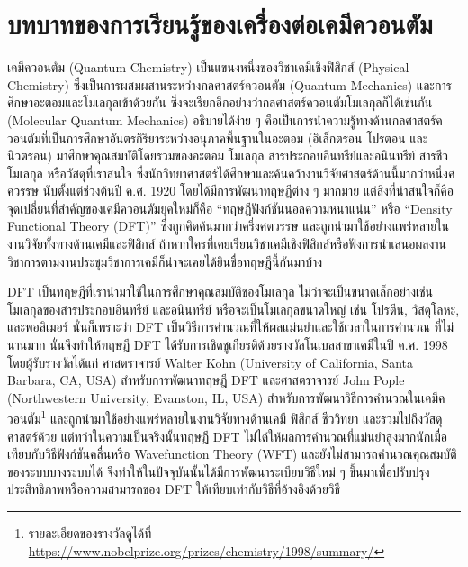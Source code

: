 \section{บทบาทของการเรียนรู้ของเครื่องต่อเคมีควอนตัม}
\label{sec:ml_in_qm}

เคมีควอนตัม (Quantum Chemistry) เป็นแขนงหนึ่งของวิชาเคมีเชิงฟิสิกส์ (Physical Chemistry) ซึ่งเป็นการผสมผสานระหว่างกลศาสตร์ควอนตัม 
(Quantum Mechanics) และการศึกษาอะตอมและโมเลกุลเข้าด้วยกัน ซึ่งจะเรียกอีกอย่างว่ากลศาสตร์ควอนตัมโมเลกุลก็ได้เช่นกัน (Molecular 
Quantum Mechanics) อธิบายได้ง่าย ๆ คือเป็นการนำความรู้ทางด้านกลศาสตร์ควอนตัมที่เป็นการศึกษาอันตรกิริยาระหว่างอนุภาคพื้นฐานในอะตอม 
(อิเล็กตรอน โปรตอน และนิวตรอน) มาศึกษาคุณสมบัติโดยรวมของอะตอม โมเลกุล สารประกอบอินทรีย์และอนินทรีย์ สารชีวโมเลกุล หรือวัสดุที่เราสนใจ 
ซึ่งนักวิทยาศาสตร์ได้ศึกษาและค้นคว้างานวิจัยศาสตร์ด้านนี้มากว่าหนึ่งศควรรษ นับตั้งแต่ช่วงต้นปี ค.ศ. 1920 โดยได้มีการพัฒนาทฤษฎีต่าง ๆ มากมาย 
แต่สิ่งที่น่าสนใจก็คือจุดเปลี่ยนที่สำคัญของเคมีควอนตัมยุคใหม่ก็คือ \enquote{ทฤษฎีฟังก์ชันนอลความหนาแน่น} หรือ \enquote{Density Functional 
Theory (DFT)}\autocite{kohn1996} ซึ่งถูกคิดค้นมากว่าครึ่งศตวรรษ และถูกนำมาใช้อย่างแพร่หลายในงานวิจัยทั้งทางด้านเคมีและฟิสิกส์ 
ถ้าหากใครที่เคยเรียนวิชาเคมีเชิงฟิสิกส์หรือฟังการนำเสนอผลงานวิชาการตามงานประชุมวิชาการเคมีก็น่าจะเคยได้ยินชื่อทฤษฎีนี้กันมาบ้าง 

DFT เป็นทฤษฎีที่เรานำมาใช้ในการศึกษาคุณสมบัติของโมเลกุล ไม่ว่าจะเป็นขนาดเล็กอย่างเช่นโมเลกุลของสารประกอบอินทรีย์ และอนินทรีย์ 
หรือจะเป็นโมเลกุลขนาดใหญ่ เช่น โปรตีน, วัสดุโลหะ, และพอลิเมอร์ นั่นก็เพราะว่า DFT เป็นวิธีการคำนวณที่ให้ผลแม่นยำและใช้เวลาในการคำนวณ%
ที่ไม่นานมาก นั่นจึงทำให้ทฤษฎี DFT ได้รับการเชิดชูเกียรติด้วยรางวัลโนเบลสาขาเคมีในปี ค.ศ. 1998 โดยผู้รับรางวัลได้แก่ ศาสตราจารย์ Walter 
Kohn (University of California, Santa Barbara, CA, USA) สำหรับการพัฒนาทฤษฎี DFT และศาสตราจารย์ John Pople 
(Northwestern University, Evanston, IL, USA) สำหรับการพัฒนาวิธีการคำนวณในเคมีควอนตัม\footnote{รายละเอียดของรางวัลดูได้ที่ 
\url{https://www.nobelprize.org/prizes/chemistry/1998/summary/}} และถูกนำมาใช้อย่างแพร่หลายในงานวิจัยทางด้านเคมี ฟิสิกส์ 
ชีววิทยา และรวมไปถึงวัสดุศาสตร์ด้วย แต่ทว่าในความเป็นจริงนั้นทฤษฎี DFT ไม่ได้ให้ผลการคำนวณที่แม่นยำสูงมากนักเมื่อเทียบกับวิธีฟังก์ชันคลื่นหรือ 
Wavefunction Theory (WFT) และยังไม่สามารถคำนวณคุณสมบัติของระบบบางระบบได้ จึงทำให้ในปัจจุบันนั้นได้มีการพัฒนาระเบียบวิธีใหม่ ๆ 
ขึ้นมาเพื่อปรับปรุงประสิทธิภาพหรือความสามารถของ DFT ให้เทียบเท่ากับวิธีที่อ้างอิงด้วยวิธี

